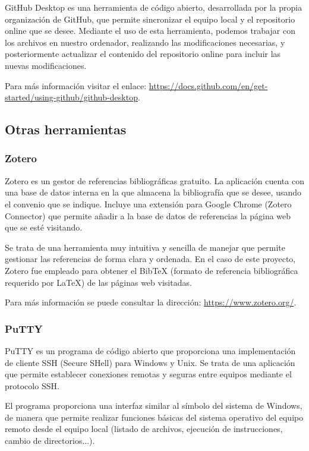 GitHub Desktop es una herramienta de código abierto, desarrollada por la propia organización de GitHub, que permite sincronizar el equipo local y el repositorio online que se desee. Mediante el uso de esta herramienta, podemos trabajar con los archivos en nuestro ordenador, realizando las modificaciones necesarias, y posteriormente actualizar el contenido del repositorio online para incluir las nuevas modificaciones.

Para más información visitar el enlace: \url{https://docs.github.com/en/get-started/using-github/github-desktop}. 

\subsection{Otras herramientas}

\subsubsection{Zotero}

Zotero es un gestor de referencias bibliográficas gratuito. La aplicación cuenta con una base de datos interna en la que almacena la bibliografía que se desee, usando el convenio que se indique. Incluye una extensión para Google Chrome (Zotero Connector) que permite añadir a la base de datos de referencias la página web que se esté visitando. 

Se trata de una herramienta muy intuitiva y sencilla de manejar que permite gestionar las referencias de forma clara y ordenada. En el caso de este proyecto, Zotero fue empleado para obtener el BibTeX (formato de referencia bibliográfica requerido por LaTeX) de las páginas web visitadas. 

Para más información se puede consultar la dirección: \url{https://www.zotero.org/}.

\subsubsection{PuTTY}

PuTTY es un programa de código abierto que proporciona una implementación de cliente SSH (Secure SHell) para Windows y Unix. Se trata de una aplicación que permite establecer conexiones remotas y seguras entre equipos mediante el protocolo SSH.

El programa proporciona una interfaz similar al símbolo del sistema de Windows, de manera que permite realizar funciones básicas del sistema operativo del equipo remoto desde el equipo local (listado de archivos, ejecución de instrucciones, cambio de directorios...).

